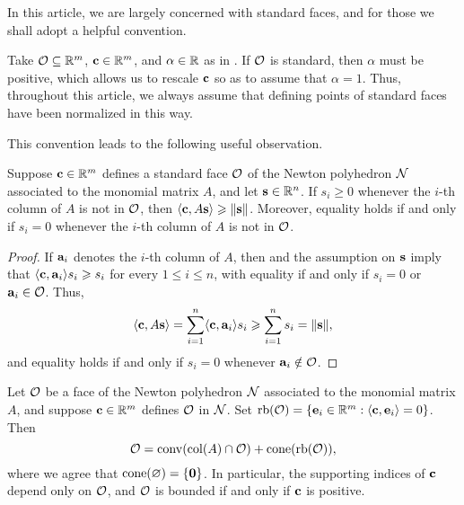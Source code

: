 \documentclass{amsart}
\begin{document}
In this article, we are largely concerned with standard faces, and for those we shall adopt a helpful convention.

\begin{convention}
\label{alpha=1: convention}
Take $\mathcal{O} \subseteq \mathbb{R}^m$, $\mathbf{c} \in \mathbb{R}^m$, and $\alpha \in \mathbb{R}$ as in .
If $\mathcal{O}$ is standard, then $\alpha$ must be positive, which allows us to rescale $\mathbf{c}$ so as to assume that $\alpha = 1$.
Thus, throughout this article, we always assume that defining points of standard faces have been normalized in this way.
\end{convention}

This convention leads to the following useful observation.

\begin{proposition}\label{prop: inner product with columns of A}
   Suppose $\mathbf{c} \in \mathbb{R}^m$ defines a standard face $\mathcal{O}$ of the Newton polyhedron $\mathcal{N}$ associated to the monomial matrix $A$, and let $\mathbf{s} \in \mathbb{R}^n$.
   If $s_i \ge 0$ whenever the $i$-th column of $A$ is not in $\mathcal{O}$, then $\langle \mathbf{c}, A\mathbf{s} \rangle \geqslant \| \mathbf{s} \|$.
   Moreover, equality holds if and only if $s_i = 0$ whenever the $i$-th column of $A$ is not in $\mathcal{O}$.
\end{proposition}

\begin{proof}
If $\mathbf{a}_i$ denotes the $i$-th column of $A$, then  and the assumption on $\mathbf{s}$ imply that $\langle \mathbf{c}, \mathbf{a}_i \rangle  s_i \geqslant s_i$ for every $1 \leq i \leq n$, with equality if and only if $s_i = 0$ or $\mathbf{a}_i \in \mathcal{O}$.
Thus,
\[ \langle \mathbf{c}, A\mathbf{s} \rangle = \sum_{i=1}^n \langle \mathbf{c}, \mathbf{a}_i \rangle s_i \geqslant  \sum_{i=1}^n s_i  = \| \mathbf{s} \|,\]
and equality holds if and only if $s_i = 0$ whenever $\mathbf{a}_i \notin \mathcal{O}$.
\end{proof}

\begin{proposition}
   \label{prop: MW for faces}
   Let $\mathcal{O}$ be a face of the Newton polyhedron $\mathcal{N}$ associated to the monomial matrix $A$, and suppose $\mathbf{c} \in \mathbb{R}^m$ defines $\mathcal{O}$ in $\mathcal{N}$.
   Set $\operatorname{rb}(\mathcal{O}) =  \{ \mathbf{e}_i \in \mathbb{R}^m : \langle \mathbf{c}, \mathbf{e}_i \rangle = 0\}$.
   Then
   \[\mathcal{O} =  \operatorname{conv}( \operatorname{col}(A) \cap \mathcal{O} ) + \operatorname{cone}(\operatorname{rb}(\mathcal{O})),\]
   where we agree that $\operatorname{cone}(\varnothing) = \{\mathbf{0}\}$.
   In particular, the supporting indices of $\mathbf{c}$ depend only on $\mathcal{O}$, and $\mathcal{O}$ is bounded if and only if $\mathbf{c}$ is positive.
\end{proposition}
\end{document}
